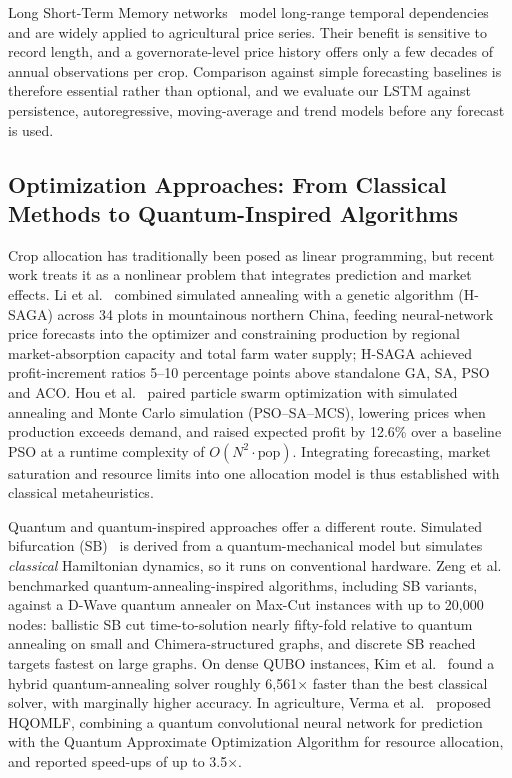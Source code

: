 \documentclass[conference,a4paper]{IEEEtran}
\begin{document}
Long Short-Term Memory networks~\cite{hochreiter1997} model long-range
temporal dependencies and are widely applied to agricultural price series.
Their benefit is sensitive to record length, and a governorate-level price
history offers only a few decades of annual observations per crop. Comparison
against simple forecasting baselines is therefore essential rather than
optional, and we evaluate our LSTM against persistence, autoregressive,
moving-average and trend models before any forecast is used.

\subsection{Optimization Approaches: From Classical Methods to Quantum-Inspired Algorithms}

Crop allocation has traditionally been posed as linear programming, but
recent work treats it as a nonlinear problem that integrates prediction and
market effects. Li et al.~\cite{li2025} combined simulated annealing with a
genetic algorithm (H-SAGA) across 34 plots in mountainous northern China,
feeding neural-network price forecasts into the optimizer and constraining
production by regional market-absorption capacity and total farm water
supply; H-SAGA achieved profit-increment ratios 5--10 percentage points above
standalone GA, SA, PSO and ACO. Hou et al.~\cite{hou2026} paired particle
swarm optimization with simulated annealing and Monte Carlo simulation
(PSO--SA--MCS), lowering prices when production exceeds demand, and raised
expected profit by 12.6\% over a baseline PSO at a runtime complexity of
$O(N^2\cdot\mathrm{pop})$. Integrating forecasting, market saturation and
resource limits into one allocation model is thus established with classical
metaheuristics.

Quantum and quantum-inspired approaches offer a different route. Simulated
bifurcation (SB)~\cite{goto2021} is derived from a quantum-mechanical model
but simulates \emph{classical} Hamiltonian dynamics, so it runs on
conventional hardware. Zeng et al.~\cite{zeng2024} benchmarked
quantum-annealing-inspired algorithms, including SB variants, against a D-Wave
quantum annealer on Max-Cut instances with up to 20{,}000 nodes: ballistic SB
cut time-to-solution nearly fifty-fold relative to quantum annealing on small
and Chimera-structured graphs, and discrete SB reached targets fastest on large
graphs. On dense QUBO instances, Kim et al.~\cite{kim2025} found a hybrid
quantum-annealing solver roughly 6{,}561$\times$ faster than the best
classical solver, with marginally higher accuracy. In agriculture, Verma et
al.~\cite{verma2025} proposed HQOMLF, combining a quantum convolutional neural
network for prediction with the Quantum Approximate Optimization Algorithm for
resource allocation, and reported speed-ups of up to 3.5$\times$.
\end{document}
